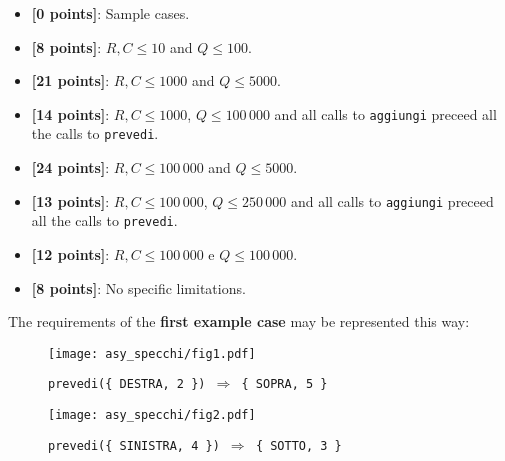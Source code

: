 \begin{itemize}[nolistsep,itemsep=2mm]
  \item \textbf{ [\phantom{0}0 points]}: Sample cases.
  \item \textbf{ [\phantom{0}8 points]}: $R, C \leq 10$ and $Q \le 100$.
  \item \textbf{ [21 points]}: $R, C \leq 1000$ and $Q \le 5000$.
  \item \textbf{ [14 points]}: $R, C \leq 1000$, $Q \leq 100\,000$ and all calls to \texttt{aggiungi} preceed all the calls to \texttt{prevedi}.
  \item \textbf{ [24 points]}: $R, C \leq 100\,000$ and $Q \le 5000$.
  \item \textbf{ [13 points]}: $R, C \leq 100\,000$, $Q \leq 250\,000$ and all calls to \texttt{aggiungi} preceed all the calls to \texttt{prevedi}.
  \item \textbf{ [12 points]}: $R, C \leq 100\,000$ e $Q \le 100\,000$.
  \item \textbf{ [\phantom{1}8 points]}: No specific limitations.
\end{itemize}



\Examples

\begin{example}
%
%
\end{example}



\Explanation

The requirements of the \textbf{first example case} may be represented this way:

\begin{minipage}{.49\textwidth}
	\begin{figure}[H]
		\centering\texttt{[image: asy\_specchi/fig1.pdf]}
		\caption*{\texttt{prevedi(\{ DESTRA, 2 \}) $\Rightarrow$ \{ SOPRA, 5 \}}}
	\end{figure}
\end{minipage}
\begin{minipage}{.49\textwidth}
	\begin{figure}[H]
		\centering\texttt{[image: asy\_specchi/fig2.pdf]}
		\caption*{\texttt{prevedi(\{ SINISTRA, 4 \}) $\Rightarrow$ \{ SOTTO, 3 \}}}
	\end{figure}
\end{minipage}

